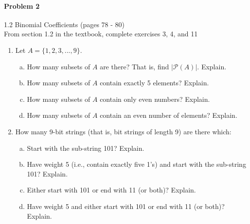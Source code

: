 \documentclass[11pt, a4paper]{article}
\newcommand\setItemNumber[1]{\setcounter{enumi}{\numexpr#1-1\relax}}
\begin{document}
	\paragraph{Problem 2} 1.2 Binomial Coefficients  (pages 78 - 80)\\
	From section 1.2 in the textbook, complete exercises 3, 4, and 11

    \begin{enumerate}

        \setItemNumber{3}
        \item Let $A = \{1,2,3,...,9\}$.

            \begin{enumerate}[(a)]

                \item How many subsets of $A$ are there? That is, find $|\mathcal{P}(A)|$. Explain.

                \item How many subsets of $A$ contain exactly 5 elements? Explain.

                \item How many subsets of $A$ contain only even numbers? Explain.

                \item How many subsets of $A$ contain an even number of elements? Explain.

            \end{enumerate}

        \item How many 9-bit strings (that is, bit strings of length 9) are there which:

            \begin{enumerate}[(a)]

                \item Start with the sub-string 101? Explain.

                \item Have weight 5 (i.e., contain exactly five 1’s) and start with the sub-string 101? Explain.

                \item Either start with 101 or end with 11 (or both)? Explain.

                \item Have weight 5 and either start with 101 or end with 11 (or both)? Explain.

            \end{enumerate}


\end{enumerate}
\end{document}
